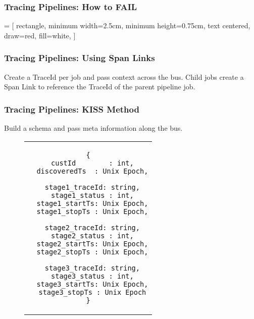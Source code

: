 \begin{frame}
    \frametitle{Tracing Pipelines: How to FAIL}
    \centering
\end{frame}

 = [
    rectangle,
    minimum width=2.5cm, 
    minimum height=0.75cm,
    text centered, 
    draw=red, 
    fill=white,
]
\begin{frame}
    \frametitle{Tracing Pipelines: Using Span Links}
    \centering
    \raggedright

    Create a TraceId per job and pass context across the bus.  Child jobs
    create a Span Link to reference the TraceId of the parent pipeline job.
\end{frame}

\begin{frame}[fragile]
    \frametitle{Tracing Pipelines: KISS Method}

    Build a schema and pass meta information along the bus.
    \begin{figure}[h!]
        \begin{tabular}{c}
        \begin{lstlisting}[linewidth=5cm]
{
  custId        : int,
  discoveredTs  : Unix Epoch,

  stage1_traceId: string,
  stage1_status : int,
  stage1_startTs: Unix Epoch,
  stage1_stopTs : Unix Epoch,

  stage2_traceId: string,
  stage2_status : int,
  stage2_startTs: Unix Epoch,
  stage2_stopTs : Unix Epoch,

  stage3_traceId: string,
  stage3_status : int,
  stage3_startTs: Unix Epoch,
  stage3_stopTs : Unix Epoch
}
        \end{lstlisting}
        \end{tabular}
    \end{figure}
\end{frame}
